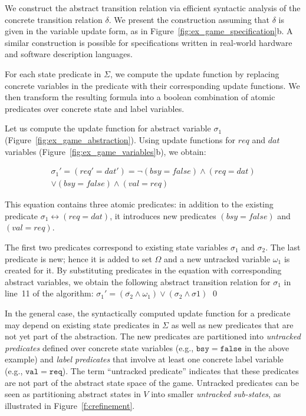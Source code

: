We construct the abstract transition relation via efficient syntactic analysis of the concrete transition relation $\delta$. We present the construction assuming that $\delta$ is given in the variable update form, as in Figure~\ref{fig:ex_game_specification}b. A similar construction is possible for specifications written in real-world hardware and software description languages.

For each state predicate in $\Sigma$, we compute the update function by replacing concrete variables in the predicate with their corresponding update functions. We then transform the resulting formula into a boolean combination of atomic predicates over concrete state and label variables.

\begin{ex}
    Let us compute the update function for abstract variable $\sigma_1$ (Figure~\ref{fig:ex_game_abstraction}).  Using update functions for $req$ and $dat$ variables (Figure~\ref{fig:ex_game_variables}b), we obtain: 
    
    \begin{multline}
    \sigma_1' = (req' = dat') = \neg(bsy = false) \land (req=dat) \\ \lor (bsy=false) \land (val=req)
    \end{multline}
    
    \noindent This equation contains three atomic predicates: in addition to the existing predicate $\sigma_1 \leftrightarrow (req=dat)$, it introduces new predicates $(bsy=false)$ and $(val=req)$.  

    The first two predicates correspond to existing state variables $\sigma_1$ and $\sigma_2$.  The last predicate is new; hence it is added to set $\Omega$ and a new untracked variable $\omega_1$ is created for it.  By substituting predicates in the equation with corresponding abstract variables, we obtain the following abstract transition relation for $\sigma_1$ in line~11 of the algorithm:
    $\sigma_1' = (\overline{\sigma_2} \land \omega_1) \lor (\sigma_2 \land \sigma1)$
    \qed
\end{ex}

In the general case, the syntactically computed update function for a predicate may depend on existing state predicates in $\Sigma$ as well as new predicates that are not yet part of the abstraction.  The new predicates are partitioned into \emph{untracked predicates} defined over concrete state variables (e.g., $\mathtt{bsy=false}$ in the above example) and \emph{label predicates} that involve at least one concrete label variable (e.g., $\mathtt{val=req}$).  The term ``untracked predicate'' indicates that these predicates are not part of the abstract state space of the game.  Untracked predicates can be seen as partitioning abstract states in $V$ into smaller \emph{untracked sub-states}, as illustrated in Figure~\ref{f:crefinement}.

